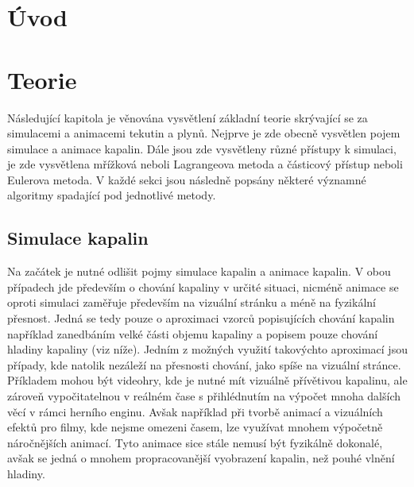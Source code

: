 \chapter{Úvod}
\label{chapter:uvod}

\chapter{Teorie}
Následující kapitola je věnována vysvětlení základní teorie skrývající se za simulacemi a animacemi tekutin a plynů. Nejprve je zde obecně vysvětlen pojem simulace a animace kapalin. Dále jsou zde vysvětleny různé přístupy k simulaci, je zde vysvětlena mřížková neboli Lagrangeova metoda a částicový přístup neboli Eulerova metoda. V každé sekci jsou následně popsány některé významné algoritmy spadající pod jednotlivé metody.

\label{chapter:teorie}
\section{Simulace kapalin}
Na začátek je nutné odlišit pojmy simulace kapalin a animace kapalin. V obou případech jde především o chování kapaliny v určité situaci, nicméně animace se oproti simulaci zaměřuje především na vizuální stránku a méně na fyzikální přesnost. Jedná se tedy pouze o aproximaci vzorců popisujících chování kapalin například zanedbáním velké části objemu kapaliny a popisem pouze chování hladiny kapaliny (viz níže). Jedním z možných využití takovýchto aproximací jsou případy, kde natolik nezáleží na přesnosti chování, jako spíše na vizuální stránce. Příkladem mohou být videohry, kde je nutné mít vizuálně přívětivou kapalinu, ale zároveň vypočitatelnou v reálném čase s přihlédnutím na výpočet mnoha dalších věcí v rámci herního enginu. Avšak například při tvorbě animací a vizuálních efektů pro filmy, kde nejsme omezeni časem, lze využívat mnohem výpočetně náročnějších animací. Tyto animace sice stále nemusí být fyzikálně dokonalé, avšak se jedná o mnohem propracovanější vyobrazení kapalin, než pouhé vlnění hladiny.

